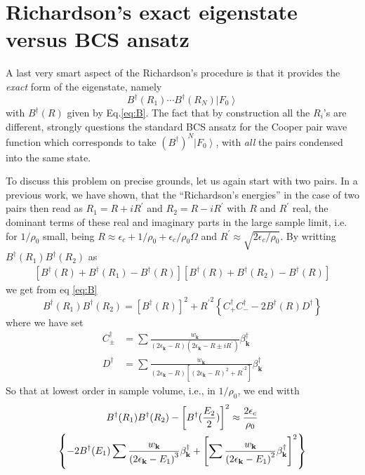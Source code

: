 \documentclass[aps,prb,superscriptaddress,twocolumn]{revtex4}
\newcommand{\vk}{\ensuremath{\mathbf{k}}}
\begin{document}
\section{Richardson's exact eigenstate versus BCS ansatz \label{sec:conn}}

A last very smart aspect of the Richardson's procedure is that it provides the 
\emph{exact} form of the eigenstate, namely 
\begin{equation}
B^{\dagger}(R_1)\cdots{}B^{\dagger}(R_N)\left|F_0\right>  
\end{equation}
with $B^{\dagger}(R)$ given by Eq.\eqref{eq:B}. The fact that by
construction all the $R_i$'s are different, strongly questions the standard
BCS ansatz for the Cooper pair wave function which corresponds to take $\left(B^{\dagger}\right)
^N\left|F_0\right> $, with \emph{all} the pairs condensed into the same
state.

To discuss this problem on precise grounds, let us again start with two pairs. In
a previous work\cite{combescotBCS}, we have shown, that the ``Richardson's
energies'' in the case of two pairs then read as $R_1=R+iR^{\prime}$ and $R_2=R-i{}R^{\prime}$ with $R$
and $R^{\prime}$ real, the dominant terms of these real and imaginary parts in the
large sample limit, i.e. for $1/\rho_0$ small, being $R\approx\epsilon_c+1/%
\rho_0+\epsilon_c/\rho_0\Omega$ and $R^{\prime}\approx\sqrt{2\epsilon_c/\rho_0}$. By writting $B^{\dagger}(R_1)B^{\dagger}(R_2)$ as 
\begin{multline}
\left[B^{\dagger}(R)+B^{\dagger}(R_1)-B^{\dagger}(R)\right] \left[%
B^{\dagger}(R)+B^{\dagger}(R_2)-B^{\dagger}(R)\right] 
\end{multline}
we get from eq \eqref{eq:B} 
\begin{equation}
B^{\dagger}(R_1)B^{\dagger}(R_2)=\left[B^{\dagger}(R)\right]
^2+{R^{\prime}}^2\left\{C^{\dagger}_+C^{\dagger}_--2B^{\dagger}(R)D^{\dagger}%
\right\} 
\end{equation}
where we have set 
\begin{align}
C^{\dagger}_{\pm}&=\sum\frac{w_\vk}{\left(2\epsilon_\vk-R\right)
\left(2\epsilon_\vk-R\pm{}iR^{\prime}\right) }\beta^{\dagger}_\vk \\
D^{\dagger}&=\sum\frac{w_\vk}{\left(2\epsilon_\vk-R\right) \left[%
\left(2\epsilon_\vk-R\right) ^2+{}{R^{\prime}}^2\right] }\beta^{\dagger}_\vk
\end{align}
So that at lowest order in sample volume, i.e., in $1/\rho_0$, we end witth 
\begin{multline}  \label{eq:BB}
B^{\dagger}(R_1)B^{\dagger}(R_2)-\left[B^{\dagger}(\frac{E _2}{2})%
\right] ^2\approx \frac{2\epsilon_c}{\rho_0} \\
\left\{-2B^{\dagger}(E _1)\sum\frac{w_\vk}{\left(2\epsilon_\vk-%
E _1\right) ^3}\beta^{\dagger}_\vk +\left[\sum\frac{w_\vk}{%
\left(2\epsilon_\vk-E _1\right) ^2}\beta^{\dagger}_\vk\right]
^2\right\}  
\end{multline}
\end{document}
